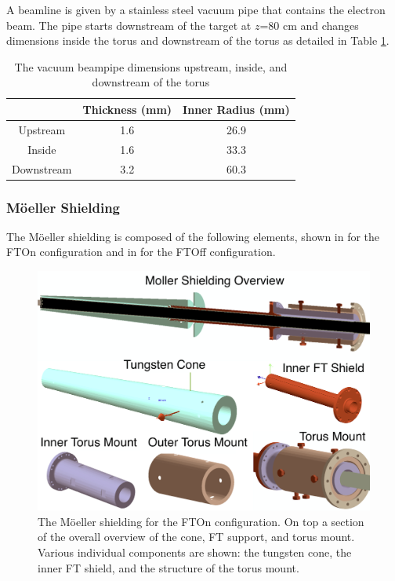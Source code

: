 A beamline is given by a stainless steel vacuum pipe that contains the electron beam.
The pipe starts downstream of the target at $z$=80 cm and changes dimensions inside
the torus and downstream of the torus as detailed in Table \ref{tab:beampipe}.

\begin{table}[h]
	\begin{center}
		\begin{tabular}{| c | c | c |}
			\hline \hline
			                & Thickness (mm) & Inner Radius (mm)   \\
			\hline
              Upstream      &    1.6     &    26.9 \\
              Inside        &    1.6     &    33.3 \\
            Downstream      &    3.2     &    60.3 \\
			\hline \hline
		\end{tabular}
	\end{center}
	\caption{The vacuum beampipe dimensions upstream, inside, and downstream of the torus}\label{tab:beampipe}
\end{table}


\subsubsection{M\"oeller Shielding}
The M\"oeller shielding is composed of the following elements, shown in  for the FTOn configuration
and in  for the FTOff configuration.

\begin{figure}
	\centering
	\includegraphics[width=0.99\columnwidth,keepaspectratio]{img/moellerShieldingFTOn.png}
	\caption{The M\"oeller shielding for the FTOn configuration. On top a section of the overall overview of the cone, FT support, and torus mount.
		     Various individual components are shown: the tungsten cone, the inner FT shield, and the structure of the torus mount.}
	\label{fig:moellerShieldingFTOn}
\end{figure}

